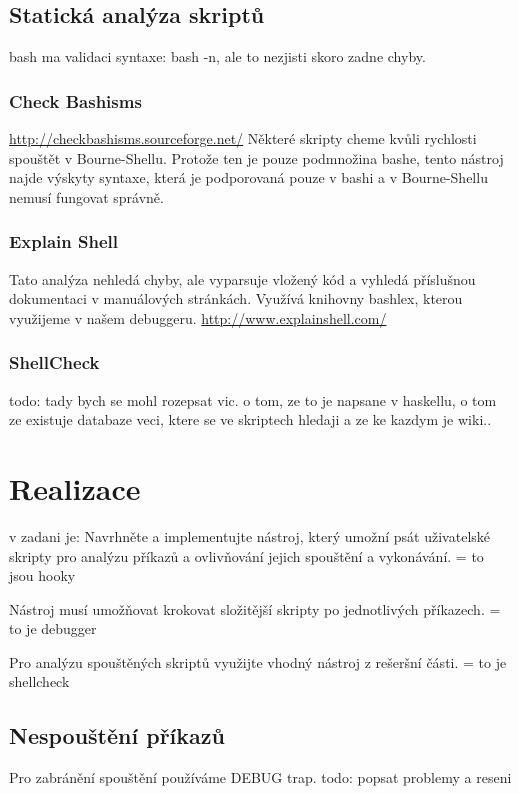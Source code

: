 \documentclass[thesis=M,czech]{FITthesis}[2012/06/26]
\begin{document}


\section{Statická analýza skriptů}

bash ma validaci syntaxe: bash -n, ale to nezjisti skoro zadne chyby.

\subsection{Check Bashisms}
\url{http://checkbashisms.sourceforge.net/}
Některé skripty cheme kvůli rychlosti spouštět v Bourne-Shellu. Protože ten je pouze podmnožina bashe, tento nástroj najde výskyty syntaxe, která je podporovaná pouze v bashi a v Bourne-Shellu nemusí fungovat správně.

\subsection{Explain Shell}
Tato analýza nehledá chyby, ale vyparsuje vložený kód a vyhledá příslušnou dokumentaci v manuálových stránkách. Využívá knihovny bashlex, kterou využijeme v našem debuggeru.
\url{http://www.explainshell.com/}


\subsection{ShellCheck}
todo: tady bych se mohl rozepsat vic. o tom, ze to je napsane v haskellu, o tom ze existuje databaze veci, ktere se ve skriptech hledaji a ze ke kazdym je wiki..

\chapter{Realizace}

v zadani je:
Navrhněte a implementujte nástroj, který umožní psát uživatelské skripty pro analýzu příkazů a ovlivňování jejich spouštění a vykonávání. = to jsou hooky

Nástroj musí umožňovat krokovat složitější skripty po jednotlivých příkazech. = to je debugger

Pro analýzu spouštěných skriptů využijte vhodný nástroj z rešeršní části. = to je shellcheck




%
%
%
%
%
\section{Nespouštění příkazů}
Pro zabránění spouštění používáme DEBUG trap.
todo: popsat problemy a reseni
\end{document}
